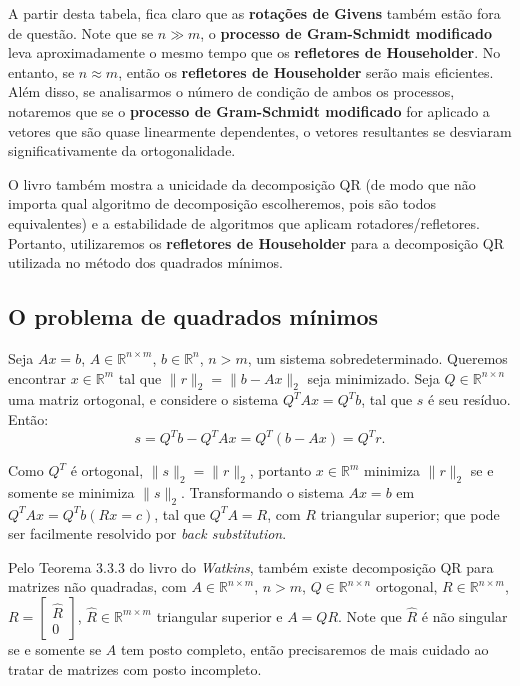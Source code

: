 \documentclass[a4paper,11pt]{article}
\begin{document}
        A partir desta tabela, fica claro que as \textbf{rotações de Givens} também estão fora de questão. Note que se $n \gg m$, o \textbf{processo de Gram-Schmidt modificado} leva aproximadamente o mesmo tempo que os \textbf{refletores de Householder}. No entanto, se $n \approx m$, então os \textbf{refletores de Householder} serão mais eficientes. Além disso, se analisarmos o número de condição de ambos os processos, notaremos que se o \textbf{processo de Gram-Schmidt modificado} for aplicado a vetores que são quase linearmente dependentes, o vetores resultantes se desviaram significativamente da ortogonalidade.
        
        O livro também mostra a unicidade da decomposição QR (de modo que não importa qual algoritmo de decomposição escolheremos, pois são todos equivalentes) e a estabilidade de algoritmos que aplicam rotadores/refletores. Portanto, utilizaremos os \textbf{refletores de Householder} para a decomposição QR utilizada no método dos quadrados mínimos.
        
    \subsection{O problema de quadrados mínimos}
        Seja $Ax=b$, $A \in \mathbb{R}^{n \times m}$, $b \in \mathbb{R}^n$, $n>m$, um sistema sobredeterminado. Queremos encontrar $x \in \mathbb{R}^m$ tal que $\|r\|_2 =  \|b-Ax\|_2$ seja minimizado. Seja $Q \in \mathbb{R}^{n \times n}$ uma matriz ortogonal, e considere o sistema $Q^TAx=Q^Tb$, tal que $s$ é seu resíduo. Então:
        $$
            s = Q^Tb-Q^TAx = Q^T(b-Ax) = Q^Tr.
        $$
        
        Como $Q^T$ é ortogonal, $\|s\|_2=\|r\|_2$, portanto $x \in \mathbb{R}^m$ minimiza $\|r\|_2$ se e somente se minimiza $\|s\|_2$. Transformando o sistema $Ax=b$ em $Q^TAx = Q^Tb (Rx=c)$, tal que $Q^TA=R$, com $R$ triangular superior; que pode ser facilmente resolvido por \textit{back substitution}.
        
        Pelo Teorema 3.3.3 do livro do \textit{Watkins}, também existe decomposição QR para matrizes não quadradas, com $A \in \mathbb{R}^{n \times m}$, $n>m$, $Q \in \mathbb{R}^{n \times n}$ ortogonal, $R \in \mathbb{R}^{n \times m}$, $R = \begin{bmatrix}\hat{R} \\ 0\end{bmatrix}$, $\hat{R} \in \mathbb{R}^{m \times m}$ triangular superior e $A=QR$. Note que $\hat{R}$ é não singular se e somente se $A$ tem posto completo, então precisaremos de mais cuidado ao tratar de matrizes com posto incompleto.
        
\end{document}
